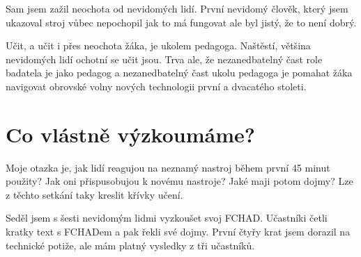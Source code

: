Sam jsem zažil neochota od nevidomých lidí. První nevidomý člověk, který jsem ukazoval stroj vůbec nepochopil jak to má fungovat ale byl jistý, že to není dobrý.

Učit, a učit i přes neochota žáka, je ukolem pedagoga.  Naštěstí, většina nevidomých lidí ochotní se učit jsou.  Trva ale, že nezanedbatelný čast role badatela je jako pedagog a nezanedbatelný čast ukolu pedagoga je pomahat žáka navigovat obrovské volny nových technologii první a dvacatého stoleti.

\section{Co vlástně výzkoumáme?}

Moje otazka je, jak lidí reagujou na neznamý nastroj během první 45 minut použity?  Jak oni přispusobujou k novému nastroje?  Jaké maji potom dojmy?  Lze z těchto setkání taky kreslit křívky učení.

Seděl jsem s šesti nevidomým lidmi vyzkoušet svoj FCHAD. Učastníki četli kratky text s FCHADem a pak řekli své dojmy.  První čtyřy krat jsem dorazil na technické potiže, ale mám platný vysledky z tři učastníků.


